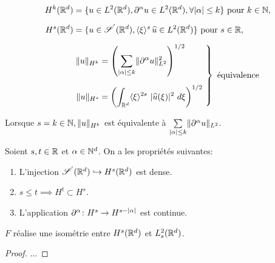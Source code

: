 \documentclass[french,a4paper,10pt]{article}
\begin{document}
            \begin{rappel}
            \begin{equation*}
                \begin{aligned}
                    H^k(\R^d) &= \{ u \in L^2(\R^d), \p^{\alpha}u \in L^2(\R^d), \forall \n{\alpha} \leq k \} \text{ pour } k\in\N,\\[2mm]
                    H^s(\R^d) &= \{ u \in \Sp(\R^d), \cxi^s \, \widehat{u} \in L^2(\R^d) \} \text{ pour } s \in \R,\\[2mm]
                    &\begin{rcases}
                        \begin{aligned}
                            \nn{u}_{H^k} &= \left(\sum\limits_{\n{\alpha}\leq k} \nn{\p^{\alpha}u}_{L^2}^2\right)^{1/2}\\[2mm]
                            \nn{u}_{H^s} &= \left(\int_{\R^d}\cxi^{2s} \ \n{\widehat{u}(\xi)}^2 \ d\xi\right)^{1/2} \ 
                        \end{aligned}
                    \end{rcases}
                    \text{ équivalence}
                \end{aligned}
            \end{equation*}

            Lorsque $s=k \in \mathbb{N}, \mathopen{}\left\|u\right\|\mathclose{}_{H^k}$ est équivalente à $\sum\limits_{\mathopen{}\left|\alpha\right|\mathclose{}\leq k} \mathopen{}\left\|\mathop{}\!{\partial}^{\alpha}u\right\|\mathclose{}_{L^2}$.

            Soient $s,t \in \mathbb{R}$ et $\alpha \in \mathbb{N}^d$. On a les propriétés suivantes:
            \begin{enumerate}
                \item L'injection $\mathscr{S}^{'}(\mathbb{R}^d) \hookrightarrow H^s(\mathbb{R}^d)$ est dense.
                \item $s\leq t \implies H^t \subset H^s$.
                \item L'application $\mathop{}\!{\partial}^{\alpha}\colon H^s \rightarrow H^{s-\mathopen{}\left|\alpha\right|\mathclose{}}$ est continue.
            \end{enumerate}
            \end{rappel}
    
            \begin{proposition}\label{prop:2.3.1}
                $F$ réalise une isométrie entre $H^s(\mathbb{R}^d)$ et $ L^2_s(\mathbb{R}^d)$.
            \end{proposition}
    
            \begin{proof}
                ...
            \end{proof}
    
\end{document}
